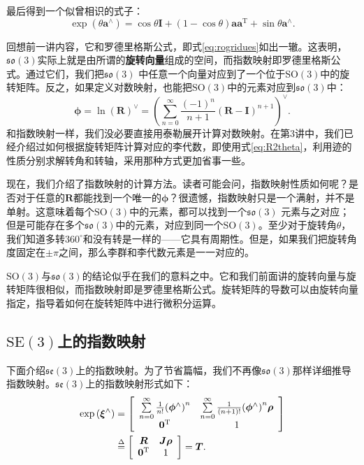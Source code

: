 最后得到一个似曾相识的式子：
\begin{equation}
\exp( \theta \bm{a}^\wedge ) = \cos \theta \bm{I} + (1 - \cos \theta )\bm{a}{\bm{a}^\mathrm{T}} + \sin \theta {\bm{a}^ \wedge }.
\end{equation}

回想前一讲内容，它和罗德里格斯公式，即式\eqref{eq:rogridues}如出一辙。这表明，$\mathfrak{so}(3)$实际上就是由所谓的\textbf{旋转向量}组成的空间，而指数映射即罗德里格斯公式。通过它们，我们把$\mathfrak{so}(3)$ 中任意一个向量对应到了一个位于$\mathrm{SO}(3)$中的旋转矩阵。反之，如果定义对数映射，也能把$\mathrm{SO}(3)$中的元素对应到$\mathfrak{so}(3)$中：
\begin{equation}
\bm{\phi}  = \ln {\left( \bm{R} \right)^ \vee } = {\left( {\sum\limits_{n = 0}^\infty  {\frac{{{{\left( { - 1} \right)}^n}}}{{n + 1}}{{\left( { \bm{R} - \bm{I}} \right)}^{n + 1}}} } \right)^ \vee }.
\end{equation}
和指数映射一样，我们没必要直接用泰勒展开计算对数映射。在第3讲中，我们已经介绍过如何根据旋转矩阵计算对应的李代数，即使用式\eqref{eq:R2theta}，利用迹的性质分别求解转角和转轴，采用那种方式更加省事一些。

现在，我们介绍了指数映射的计算方法。读者可能会问，指数映射性质如何呢？是否对于任意的$\bm{R}$都能找到一个唯一的$\bm{\phi}$？很遗憾，指数映射只是一个满射，并不是单射。这意味着每个$\mathrm{SO}(3)$中的元素，都可以找到一个$\mathfrak{so}(3)$ 元素与之对应；但是可能存在多个$\mathfrak{so}(3)$中的元素，对应到同一个$\mathrm{SO}(3)$。至少对于旋转角$\theta$，我们知道多转$360^\circ$和没有转是一样的——它具有周期性。但是，如果我们把旋转角度固定在$\pm \pi$之间，那么李群和李代数元素是一一对应的。

$\mathrm{SO}(3)$与$\mathfrak{so}(3)$的结论似乎在我们的意料之中。它和我们前面讲的旋转向量与旋转矩阵很相似，而指数映射即是罗德里格斯公式。旋转矩阵的导数可以由旋转向量指定，指导着如何在旋转矩阵中进行微积分运算。

\subsection{$\mathrm{SE}(3)$上的指数映射}

下面介绍$\mathfrak{se}(3)$上的指数映射。为了节省篇幅，我们不再像$\mathfrak{so}(3)$那样详细推导指数映射。$\mathfrak{se}(3)$上的指数映射形式如下：
\begin{align}
\exp \left( {{ \bm{\xi} ^ \wedge }} \right) &= \left[ {\begin{array}{*{20}{c}}
	{\sum\limits_{n = 0}^\infty  {\frac{1}{{n!}}{{\left( {{\bm{\phi} ^ \wedge }} \right)}^n}} }&{\sum\limits_{n = 0}^\infty  {\frac{1}{{\left( {n + 1} \right)!}}{{\left( {{\bm{\phi} ^ \wedge }} \right)}^n} \bm{\rho} } }\\
	{{\bm{0}^\mathrm{T}}}&1
	\end{array}} \right] \\
&\buildrel \Delta \over =  \left[ {\begin{array}{*{20}{c}}
	\bm{R} &{\bm{J\rho} } \\
	{{\bm{0}^\mathrm{T}}}&1
	\end{array}} \right] = \bm{T}.
\end{align}


